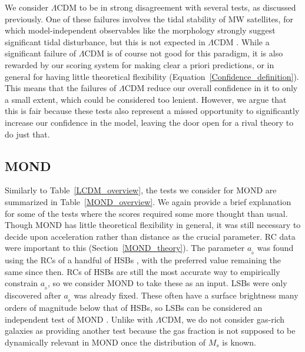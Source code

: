 \documentclass[fleqn,usenatbib,useAMS,onecolumn]{mnras} %
\begin{document}
We consider $\Lambda$CDM to be in strong disagreement with several tests, as discussed previously. One of these failures involves the tidal stability of MW satellites, for which model-independent observables like the morphology strongly suggest significant tidal disturbance, but this is not expected in $\Lambda$CDM \citep{McGaugh_Wolf_2010}. While a significant failure of $\Lambda$CDM is of course not good for this paradigm, it is also rewarded by our scoring system for making clear a priori predictions, or in general for having little theoretical flexibility (Equation~\ref{Confidence_definition}). This means that the failures of $\Lambda$CDM reduce our overall confidence in it to only a small extent, which could be considered too lenient. However, we argue that this is fair because these tests also represent a missed opportunity to significantly increase our confidence in the model, leaving the door open for a rival theory to do just that.



\subsection{MOND}
\label{MOND_comparison_section}

Similarly to Table~\ref{LCDM_overview}, the tests we consider for MOND are summarized in Table~\ref{MOND_overview}. We again provide a brief explanation for some of the tests where the scores required some more thought than usual. Though MOND has little theoretical flexibility in general, it was still necessary to decide upon acceleration rather than distance as the crucial parameter. RC data were important to this (Section~\ref{MOND_theory}). The parameter $a_{_0}$ was found using the RCs of a handful of HSBs \citep{Begeman_1991}, with the preferred value remaining the same since then. RCs of HSBs are still the most accurate way to empirically constrain $a_{_0}$, so we consider MOND to take these as an input. LSBs were only discovered after $a_{_0}$ was already fixed. These often have a surface brightness many orders of magnitude below that of HSBs, so LSBs can be considered an independent test of MOND \citep{McGaugh_1998}. Unlike with $\Lambda$CDM, we do not consider gas-rich galaxies as providing another test because the gas fraction is not supposed to be dynamically relevant in MOND once the distribution of $M_s$ is known.
\end{document}
